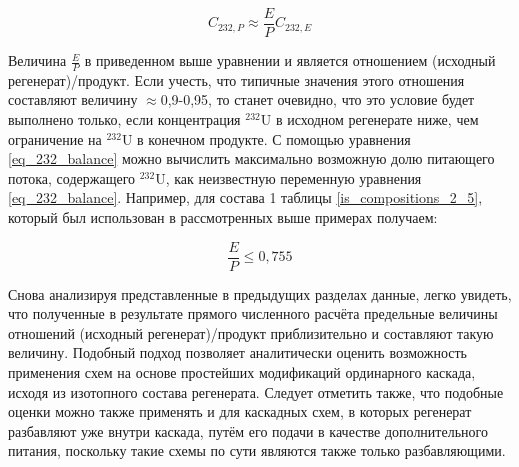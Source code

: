 
\begin{equation}
  \label{eq_232_balance_}
    C_{232,P} \approx \frac{E}{P} C_{232,E}
  \end{equation}

Величина $\frac{E}{P}$ в приведенном выше уравнении и является отношением (исходный регенерат)/продукт. Если учесть, что типичные значения этого отношения составляют величину $\approx$0,9-0,95, то станет очевидно, что это условие будет выполнено только, если концентрация $^{232}$U в исходном регенерате ниже, чем ограничение на $^{232}$U в конечном продукте. 
С помощью уравнения \ref{eq_232_balance} можно вычислить максимально возможную долю питающего потока, содержащего $^{232}$U, как неизвестную переменную уравнения \ref{eq_232_balance}. Например, для состава 1 таблицы \ref{is_compositions_2_5}, который был использован в рассмотренных выше примерах получаем:



\begin{equation}
  \label{eq_232_balance_X_}
    \frac{E}{P} \leq 0,755
\end{equation}


Снова анализируя представленные в предыдущих разделах данные, легко увидеть, что полученные в результате прямого численного расчёта предельные величины отношений (исходный регенерат)/продукт приблизительно и составляют такую величину.
Подобный подход позволяет аналитически оценить возможность применения схем на основе простейших модификаций ординарного каскада, исходя из изотопного состава регенерата. Следует отметить также, что подобные оценки можно также применять и для каскадных схем, в которых регенерат разбавляют уже внутри каскада, путём его подачи в качестве дополнительного питания, поскольку такие схемы по сути являются также только разбавляющими.


